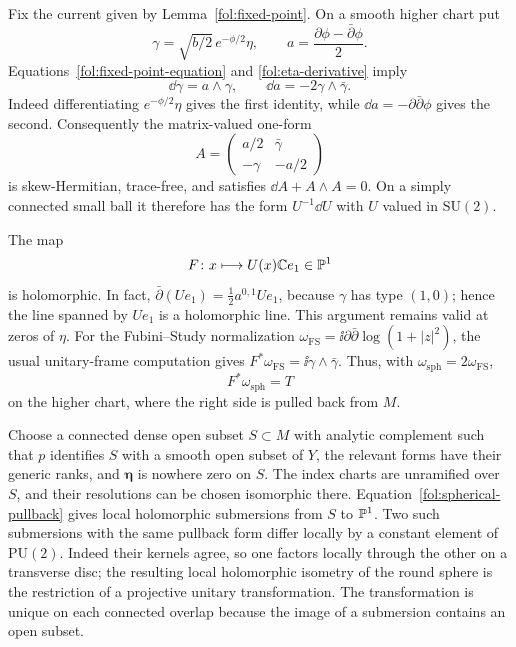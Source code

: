 Fix the current given by Lemma~\ref{fol:fixed-point}.  On a smooth higher
chart put
\begin{equation}\label{fol:unitary-forms}
 \gamma=\sqrt{b/2}\,e^{-\phi/2}\eta,\qquad
 a=\frac{\partial\phi-\bar\partial\phi}{2}.
\end{equation}
Equations~\eqref{fol:fixed-point-equation} and
\eqref{fol:eta-derivative} imply
\begin{equation}\label{fol:structure-equations}
 \dd\gamma=a\wedge\gamma,\qquad
 \dd a=-2\gamma\wedge\bar\gamma.
\end{equation}
Indeed differentiating $e^{-\phi/2}\eta$ gives the first identity, while
$\dd a=-\partial\bar\partial\phi$ gives the second.  Consequently the
matrix-valued one-form
\begin{equation}\label{fol:flat-matrix}
 A=
 \begin{pmatrix}
  a/2 & \bar\gamma\\
  -\gamma & -a/2
 \end{pmatrix}
\end{equation}
is skew-Hermitian, trace-free, and satisfies
$\dd A+A\wedge A=0$.  On a simply connected small ball it therefore
has the form $U^{-1}\dd U$ with $U$ valued in $\mathrm{SU}(2)$.

The map
\[
 F\colon x\longmapsto U(x)\mathbb{C} e_1\in\mathbb{P}^1
\]
is holomorphic.  In fact,
$\bar\partial(Ue_1)=\tfrac12a^{0,1}Ue_1$, because $\gamma$ has type
$(1,0)$; hence the line spanned by $Ue_1$ is a holomorphic line.
This argument remains valid at zeros of $\eta$.
For the Fubini--Study normalization
$\omega_{\mathrm{FS}}=\ii\partial\bar\partial\log(1+|z|^2)$,
the usual unitary-frame computation gives
$F^*\omega_{\mathrm{FS}}=\ii\gamma\wedge\bar\gamma$.
Thus, with $\omega_{\mathrm{sph}}=2\omega_{\mathrm{FS}}$,
\begin{equation}\label{fol:spherical-pullback}
 F^*\omega_{\mathrm{sph}}=T
\end{equation}
on the higher chart, where the right side is pulled back from $M$.

Choose a connected dense open subset $S\subset M$ with analytic
complement such that $p$ identifies $S$ with a smooth open subset of
$Y$, the relevant forms have their generic ranks, and
$\boldsymbol\eta$ is nowhere zero on $S$.  The index charts are
unramified over $S$, and their resolutions can be chosen isomorphic
there.  Equation~\eqref{fol:spherical-pullback} gives local holomorphic
submersions from $S$ to $\mathbb{P}^1$.  Two such submersions with the same
pullback form differ locally by a constant element of
$\mathrm{PU}(2)$.  Indeed their kernels agree, so one factors locally
through the other on a transverse disc; the resulting local holomorphic
isometry of the round sphere is the restriction of a projective unitary
transformation.  The transformation is unique on each connected
overlap because the image of a submersion contains an open subset.

